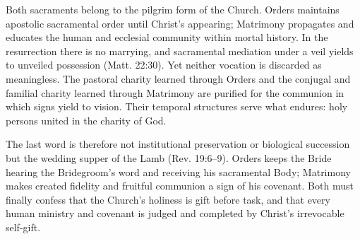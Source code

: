 Both sacraments belong to the pilgrim form of the Church. Orders maintains apostolic sacramental order until Christ's appearing; Matrimony propagates and educates the human and ecclesial community within mortal history. In the resurrection there is no marrying, and sacramental mediation under a veil yields to unveiled possession (Matt. 22:30). Yet neither vocation is discarded as meaningless. The pastoral charity learned through Orders and the conjugal and familial charity learned through Matrimony are purified for the communion in which signs yield to vision. Their temporal structures serve what endures: holy persons united in the charity of God.

The last word is therefore not institutional preservation or biological succession but the wedding supper of the Lamb (Rev. 19:6--9). Orders keeps the Bride hearing the Bridegroom's word and receiving his sacramental Body; Matrimony makes created fidelity and fruitful communion a sign of his covenant. Both must finally confess that the Church's holiness is gift before task, and that every human ministry and covenant is judged and completed by Christ's irrevocable self-gift.
